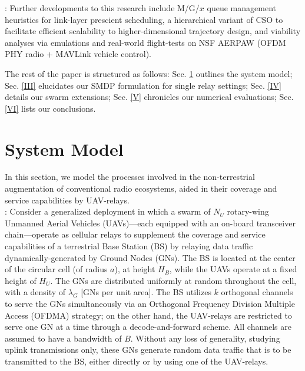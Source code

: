 \documentclass[10pt,twocolumn]{IEEEtran}
\begin{document}
: Further developments to this research include M/G/$x$ queue management heuristics for link-layer prescient scheduling, a hierarchical variant of CSO to facilitate efficient scalability to higher-dimensional trajectory design, and viability analyses via emulations and real-world flight-tests on NSF AERPAW (OFDM PHY radio + MAVLink vehicle control).

The rest of the paper is structured as follows: Sec. \ref{II} outlines the system model; Sec. \ref{III} elucidates our SMDP formulation for single relay settings; Sec. \ref{IV} details our swarm extensions; Sec. \ref{V} chronicles our numerical evaluations; Sec. \ref{VI} lists our conclusions.

\vspace{-6mm}
\section{System Model}\label{II}
In this section, we model the processes involved in the non-terrestrial augmentation of conventional radio ecosystems, aided in their coverage and service capabilities by UAV-relays.\\
: Consider a generalized deployment in which a swarm of $N_{U}$ rotary-wing Unmanned Aerial Vehicles (UAVs)---each equipped with an on-board transceiver chain---operate as cellular relays to supplement the coverage and service capabilities of a terrestrial Base Station (BS) by relaying data traffic dynamically-generated by Ground Nodes (GNs). The BS is located at the center of the circular cell (of radius $a$), at height $H_{B}$, while the UAVs operate at a fixed height of $H_{U}$. The GNs are distributed uniformly at random throughout the cell, with a density of $\lambda_{G}$ [GNs per unit area]. The BS utilizes $k$ orthogonal channels to serve the GNs simultaneously via an Orthogonal Frequency Division Multiple Access (OFDMA) strategy; on the other hand, the UAV-relays are restricted to serve one GN at a time through a decode-and-forward scheme. All channels are assumed to have a bandwidth of $B$. Without any loss of generality, studying uplink transmissions only, these GNs generate random data traffic that is to be transmitted to the BS, either directly or by using one of the UAV-relays.\\
\end{document}
